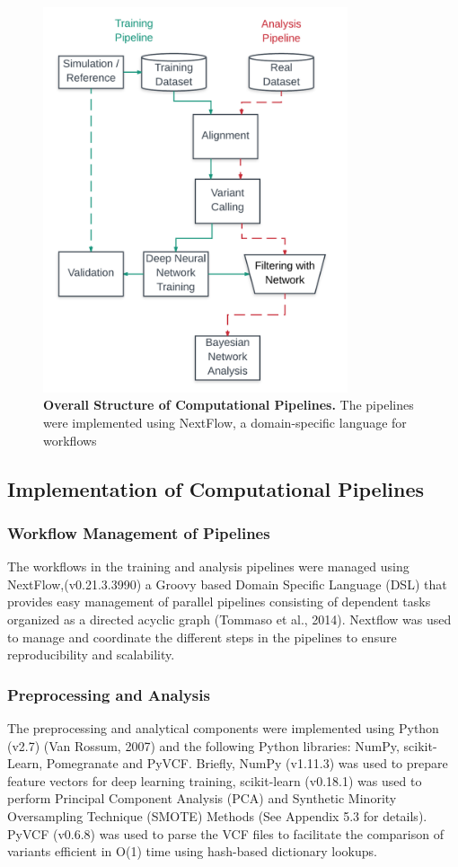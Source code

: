 \documentclass{article}
\begin{document}
\begin{figure}[H]
\includegraphics[width=0.8\textwidth]{trainingpathway.png}
\centering
\caption{\textbf{Overall Structure of Computational Pipelines.} The pipelines were implemented using NextFlow, a domain-specific language for workflows}
\end{figure}
\subsection{Implementation of Computational Pipelines}
\subsubsection{Workflow Management of Pipelines}
The workflows in the training and analysis pipelines were managed using NextFlow,(v0.21.3.3990) a Groovy based Domain Specific Language (DSL) that provides easy management of parallel pipelines consisting of dependent tasks organized as a directed acyclic graph (Tommaso et al., 2014). Nextflow was used to manage and coordinate the different steps in the pipelines to ensure reproducibility and scalability.
\subsubsection{Preprocessing and Analysis}
The preprocessing and analytical components were implemented using Python (v2.7) (Van Rossum, 2007) and the following Python libraries: NumPy, scikit-Learn, Pomegranate and PyVCF. Briefly, NumPy (v1.11.3) was used to prepare feature vectors for deep learning training, scikit-learn (v0.18.1) was used to perform Principal Component Analysis (PCA) and Synthetic Minority Oversampling Technique (SMOTE) Methods (See Appendix 5.3 for details). PyVCF (v0.6.8) was used to parse the VCF files to facilitate the comparison of variants efficient in O(1) time using hash-based dictionary lookups. 
\end{document}
